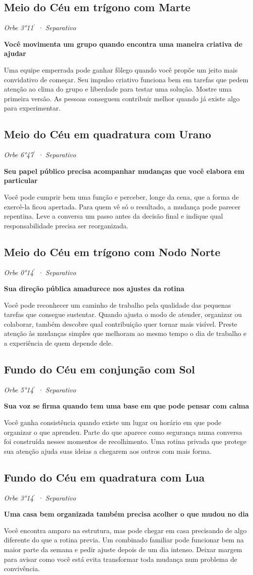 \documentclass[11pt,a4paper]{article}
\newcommand{\leitura}[3]{\subsection{#1}\textit{#2}\par #3}
\newcommand{\subtituloleitura}[1]{\textbf{#1}\par\nopagebreak[4]}
\begin{document}
\leitura{Meio do Céu em trígono com Marte}{Orbe 3°11\ensuremath{^{\prime}} · Separativo}{
\subtituloleitura{Você movimenta um grupo quando encontra uma maneira criativa de ajudar}
Uma equipe emperrada pode ganhar fôlego quando você propõe um jeito mais convidativo de começar. Seu impulso criativo funciona bem em tarefas que pedem atenção ao clima do grupo e liberdade para testar uma solução. Mostre uma primeira versão. As pessoas conseguem contribuir melhor quando já existe algo para experimentar.
}

\leitura{Meio do Céu em quadratura com Urano}{Orbe 6°47\ensuremath{^{\prime}} · Separativo}{
\subtituloleitura{Seu papel público precisa acompanhar mudanças que você elabora em particular}
Você pode cumprir bem uma função e perceber, longe da cena, que a forma de exercê-la ficou apertada. Para quem vê só o resultado, a mudança pode parecer repentina. Leve a conversa um passo antes da decisão final e indique qual responsabilidade precisa ser reorganizada.
}

\leitura{Meio do Céu em trígono com Nodo Norte}{Orbe 0°14\ensuremath{^{\prime}} · Separativo}{
\subtituloleitura{Sua direção pública amadurece nos ajustes da rotina}
Você pode reconhecer um caminho de trabalho pela qualidade das pequenas tarefas que consegue sustentar. Quando ajusta o modo de atender, organizar ou colaborar, também descobre qual contribuição quer tornar mais visível. Preste atenção às mudanças simples que melhoram ao mesmo tempo o dia de trabalho e a experiência de quem depende dele.
}

\leitura{Fundo do Céu em conjunção com Sol}{Orbe 5°14\ensuremath{^{\prime}} · Separativo}{
\subtituloleitura{Sua voz se firma quando tem uma base em que pode pensar com calma}
Você ganha consistência quando existe um lugar ou horário em que pode organizar o que aprendeu. Parte do que aparece como segurança numa conversa foi construída nesses momentos de recolhimento. Uma rotina privada que protege sua atenção ajuda suas ideias a chegarem aos outros com mais forma.
}

\leitura{Fundo do Céu em quadratura com Lua}{Orbe 3°14\ensuremath{^{\prime}} · Separativo}{
\subtituloleitura{Uma casa bem organizada também precisa acolher o que mudou no dia}
Você encontra amparo na estrutura, mas pode chegar em casa precisando de algo diferente do que a rotina previa. Um combinado familiar pode funcionar bem na maior parte da semana e pedir ajuste depois de um dia intenso. Deixar margem para avisar como você está evita transformar toda mudança num problema de convivência.
}
\end{document}
